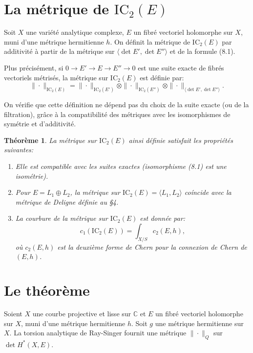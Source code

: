 \documentclass[11pt,a4paper]{article}
\theoremstyle{plain}
\newtheorem{theorem}{Th\'eor\`eme}[section]
\theoremstyle{definition}
\newcommand{\IC}{\mathrm{IC}}
\newcommand{\C}{\mathbb{C}}
\begin{document}
\section{La m\'etrique de $\IC_2(E)$}

Soit $X$ une vari\'et\'e analytique complexe, $E$ un fibr\'e vectoriel holomorphe sur $X$, muni d'une m\'etrique hermitienne $h$. On d\'efinit la m\'etrique de $\IC_2(E)$ par additivit\'e \`a partir de la m\'etrique sur $\langle \det E', \det E'' \rangle$ et de la formule (8.1).

Plus pr\'ecis\'ement, si $0 \to E' \to E \to E'' \to 0$ est une suite exacte de fibr\'es vectoriels m\'etris\'es, la m\'etrique sur $\IC_2(E)$ est d\'efinie par:
\begin{equation}
\|\cdot\|_{\IC_2(E)} = \|\cdot\|_{\IC_2(E')} \otimes \|\cdot\|_{\IC_2(E'')} \otimes \|\cdot\|_{\langle \det E', \det E'' \rangle}.
\end{equation}

On v\'erifie que cette d\'efinition ne d\'epend pas du choix de la suite exacte (ou de la filtration), gr\^ace \`a la compatibilit\'e des m\'etriques avec les isomorphismes de sym\'etrie et d'additivit\'e.

\begin{theorem}
La m\'etrique sur $\IC_2(E)$ ainsi d\'efinie satisfait les propri\'et\'es suivantes:
\begin{enumerate}
\item[(i)] Elle est compatible avec les suites exactes (isomorphisme (8.1) est une isom\'etrie).
\item[(ii)] Pour $E = L_1 \oplus L_2$, la m\'etrique sur $\IC_2(E) = \langle L_1, L_2 \rangle$ co\'incide avec la m\'etrique de Deligne d\'efinie au \S4.
\item[(iii)] La courbure de la m\'etrique sur $\IC_2(E)$ est donn\'ee par:
\begin{equation}
c_1(\IC_2(E)) = \int_{X/S} c_2(E, h),
\end{equation}
o\`u $c_2(E, h)$ est la deuxi\`eme forme de Chern pour la connexion de Chern de $(E, h)$.
\end{enumerate}
\end{theorem}

\section{Le th\'eor\`eme}

Soient $X$ une courbe projective et lisse sur $\C$ et $E$ un fibr\'e vectoriel holomorphe sur $X$, muni d'une m\'etrique hermitienne $h$. Soit $g$ une m\'etrique hermitienne sur $X$. La torsion analytique de Ray-Singer fournit une m\'etrique $\|\cdot\|_Q$ sur $\det H^*(X, E)$.
\end{document}

